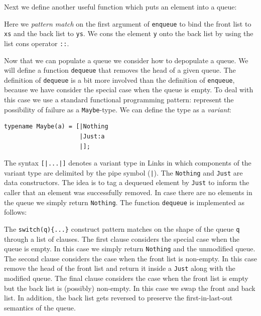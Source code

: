 \documentclass[12pt,mscres,cdtppar,twoside,openright,logo,rightchapter,normalheadings]{infthesis}
\newcommand{\snippet}[1]{}
\theoremstyle{definition}
\begin{document}
Next we define another useful function which puts an element into a queue: 
%
\snippet{enqueue.links}
%
Here we \emph{pattern match} on the first argument of
\lstinline$enqueue$ to bind the front list to \lstinline$xs$ and the
back list to \lstinline$ys$. We cons the element \lstinline$y$ onto
the back list by using the list cons operator \lstinline$::$.

Now that we can populate a queue we consider how to depopulate a
queue. We will define a function \lstinline$dequeue$ that removes the
head of a given queue. The definition of \lstinline$dequeue$ is a bit
more involved than the definition of \lstinline$enqueue$, because we
have consider the special case when the queue is empty. To deal with
this case we use a standard functional programming pattern: represent
the possibility of failure as a \lstinline$Maybe$-type. We can define
the type as a \emph{variant}:
%
\begin{lstlisting}
typename Maybe(a) = [|Nothing
                     |Just:a
                     |];
\end{lstlisting}
%
The syntax \lstinline$[|...|]$ denotes a variant type in Links in
which components of the variant type are delimited by the pipe symbol
(\lstinline$|$). The \lstinline$Nothing$ and \lstinline$Just$ are data
constructors. The idea is to tag a dequeued element by
\lstinline$Just$ to inform the caller that an element was successfully
removed. In case there are no elements in the queue we simply return
\lstinline$Nothing$. The function \lstinline$dequeue$ is implemented
as follows:
%
\snippet{dequeue.links}
%
The \lstinline$switch(q){...}$ construct pattern matches on the shape
of the queue \lstinline$q$ through a list of clauses. The first clause
considers the special case when the queue is empty. In this case we
simply return \lstinline$Nothing$ and the unmodified queue. The second
clause considers the case when the front list is non-empty. In this
case remove the head of the front list and return it inside a
\lstinline$Just$ along with the modified queue. The final clause
considers the case when the front list is empty but the back list is
(possibly) non-empty. In this case we swap the front and back list. In
addition, the back list gets reversed to preserve the
first-in-last-out semantics of the queue.
\end{document}
